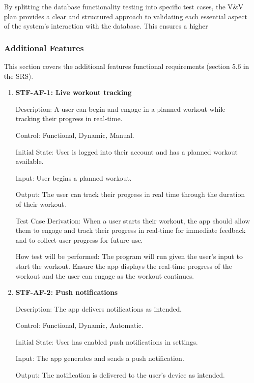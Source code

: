 \documentclass[12pt, titlepage]{article}
\begin{document}
By splitting the database functionality testing into specific test cases, the V&V plan provides a clear and structured approach to validating each essential aspect of the system’s interaction with the database. This ensures a higher


    \subsubsection{Additional Features}
    This section covers the additional features functional requirements (section 5.6 in the SRS).

    \begin{enumerate}

        \item{\textbf{STF-AF-1: Live workout tracking}\\}

        Description: A user can begin and engage in a planned workout while tracking their progress in real-time.

        Control: Functional, Dynamic, Manual.

        Initial State: User is logged into their account and has a planned workout available.

        Input: User begins a planned workout.

        Output: The user can track their progress in real time through the duration of their workout.

        Test Case Derivation: When a user starts their workout, the app should allow them to engage and track their progress in real-time for immediate feedback and to collect user progress for future use.

        How test will be performed: The program will run given the user’s input to start the workout. Ensure the app displays the real-time progress of the workout and the user can engage as the workout continues.

        \item{\textbf{STF-AF-2: Push notifications}\\}

        Description: The app delivers notifications as intended.

        Control: Functional, Dynamic, Automatic.

        Initial State: User has enabled push notifications in settings.

        Input: The app generates and sends a push notification.

        Output: The notification is delivered to the user’s device as intended.


\end{enumerate}
\end{document}
